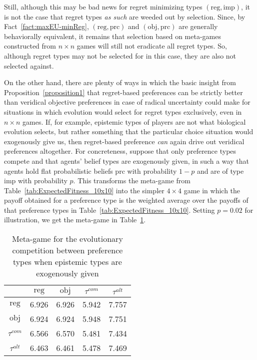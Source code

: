 \documentclass[fleqn,reqno,11pt]{article}
\begin{document}
Still, although this may be bad news for regret minimizing types
$(\text{reg}, \text{imp})$, it is not the case that regret types \emph{as such} are weeded
out by selection. Since, by Fact~\ref{fact:maxEU-minReg}, $(\text{reg}, \text{prc})$ and
$(\text{obj}, \text{prc})$ are generally behaviorally equivalent, it remains that
selection based on meta-games constructed from $n \times n$ games will still not eradicate all
regret types. So, although regret types may not be selected for in this case, they are also not
selected against.

On the other hand, there are plenty of ways in which the basic insight from
Proposition~\ref{proposition1} that regret-based preferences can be strictly better than
veridical objective preferences in case of radical uncertainty could make for situations in
which evolution would select for regret types exclusively, even in $n \times n$ games. If, for
example, epistemic types of players are not what biological evolution selects, but rather
something that the particular choice situation would exogenously give us, then regret-based
preference \emph{can} again drive out veridical preferences altogether. For concreteness,
suppose that only preference types compete and that agents' belief types are exogenously
given, in such a way that agents hold flat probabilistic beliefs $\text{prc}$ with probability
$1-p$ and are of type $\text{imp}$ with probability $p$. This transforms the meta-game from
Table~\ref{tab:ExpectedFitness_10x10} into the simpler $4 \times 4$ game in which the payoff
obtained for a preference type is the weighted average over the payoffs of that preference
types in Table~\ref{tab:ExpectedFitness_10x10}. Setting $p = 0.02$ for illustration, we get the
meta-game in Table~\ref{tab:ExogeneousEpistemics}. 

\begin{table}[]
\centering
\begin{tabular}{ccccc}
  \toprule
  & $\text{reg}$ 
  & $\text{obj}$ 
  & $\tau^{com}$
  & $\tau^{alt}$ \\ 
  \midrule
  $\text{reg} $ & 6.926 & 6.926 & 5.942 & 7.757 \\ 
  $\text{obj} $ & 6.924 & 6.924 & 5.948 & 7.751 \\ 
  $\tau^{com }$ & 6.566 & 6.570 & 5.481 & 7.434 \\ 
  $\tau^{alt} $ & 6.463 & 6.461 & 5.478 & 7.469 \\ 
   \bottomrule
\end{tabular}
\caption{Meta-game for the evolutionary competition between preference types when epistemic types are exogenously
  given}
\label{tab:ExogeneousEpistemics}
\end{table}
\end{document}
